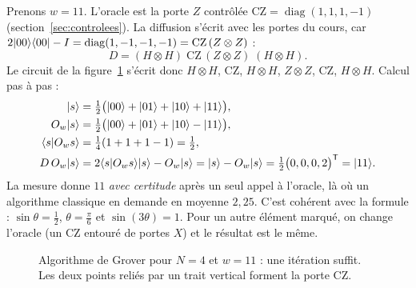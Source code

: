 Prenons $w=11$. L'oracle est la porte $Z$ contrôlée $\mathrm{CZ}=\operatorname{diag}(1,1,1,-1)$
(section~\ref{sec:controlees}). La diffusion s'écrit avec les portes du cours, car
$2|00\rangle\langle 00|-I=\operatorname{diag}(1,-1,-1,-1)=\mathrm{CZ}\,(Z\otimes Z)$ :
\[
  D=(H\otimes H)\;\mathrm{CZ}\,(Z\otimes Z)\;(H\otimes H).
\]
Le circuit de la figure~\ref{fig:grover-circ} s'écrit donc $H\otimes H$, $\mathrm{CZ}$,
$H\otimes H$, $Z\otimes Z$, $\mathrm{CZ}$, $H\otimes H$. Calcul pas à pas :
\begin{align*}
  |s\rangle&=\tfrac12\big(|00\rangle+|01\rangle+|10\rangle+|11\rangle\big),\\
  O_w|s\rangle&=\tfrac12\big(|00\rangle+|01\rangle+|10\rangle-|11\rangle\big),\\
  \langle s|O_w s\rangle&=\tfrac14(1+1+1-1)=\tfrac12,\\
  D\,O_w|s\rangle&=2\langle s|O_w s\rangle|s\rangle-O_w|s\rangle=|s\rangle-O_w|s\rangle
    =\tfrac12\big(0,0,0,2\big)^{\mathsf T}=|11\rangle.
\end{align*}
La mesure donne $11$ \emph{avec certitude} après un seul appel à l'oracle, là où un algorithme
classique en demande en moyenne $2{,}25$. C'est cohérent avec la formule : $\sin\theta=\frac12$,
$\theta=\frac\pi6$ et $\sin(3\theta)=1$. Pour un autre élément marqué, on change l'oracle (un
CZ entouré de portes $X$) et le résultat est le même.

\begin{figure}[!ht]
\centering
{}
\caption{Algorithme de Grover pour $N=4$ et $w=11$ : une itération suffit. Les deux points
reliés par un trait vertical forment la porte CZ.}
\label{fig:grover-circ}
\end{figure}

